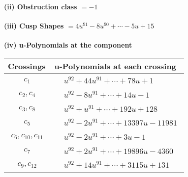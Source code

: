\documentclass[1p]{elsarticle_modified}
\theoremstyle{definition}
\begin{document}
\flushleft \textbf{(ii) Obstruction class $= -1$}\\~\\
\flushleft \textbf{(iii) Cusp Shapes $= 4 u^{91}-8 u^{90}+\cdots-5 u+15$}\\~\\
\newpage\renewcommand{\arraystretch}{1}
\flushleft \textbf{(iv) u-Polynomials at the component}\newline \\
\begin{tabular}{m{50pt}|m{274pt}}
Crossings & \hspace{64pt}u-Polynomials at each crossing \\
\hline $$\begin{aligned}c_{1}\end{aligned}$$&$\begin{aligned}
&u^{92}+44 u^{91}+\cdots+78 u+1
\end{aligned}$\\
\hline $$\begin{aligned}c_{2},c_{4}\end{aligned}$$&$\begin{aligned}
&u^{92}-8 u^{91}+\cdots+14 u-1
\end{aligned}$\\
\hline $$\begin{aligned}c_{3},c_{8}\end{aligned}$$&$\begin{aligned}
&u^{92}+u^{91}+\cdots+192 u+128
\end{aligned}$\\
\hline $$\begin{aligned}c_{5}\end{aligned}$$&$\begin{aligned}
&u^{92}-2 u^{91}+\cdots+13397 u-11981
\end{aligned}$\\
\hline $$\begin{aligned}c_{6},c_{10},c_{11}\end{aligned}$$&$\begin{aligned}
&u^{92}-2 u^{91}+\cdots+3 u-1
\end{aligned}$\\
\hline $$\begin{aligned}c_{7}\end{aligned}$$&$\begin{aligned}
&u^{92}+2 u^{91}+\cdots+19896 u-4360
\end{aligned}$\\
\hline $$\begin{aligned}c_{9},c_{12}\end{aligned}$$&$\begin{aligned}
&u^{92}+14 u^{91}+\cdots+3115 u+131
\end{aligned}$\\
\hline
\end{tabular}\\~\\
\end{document}
